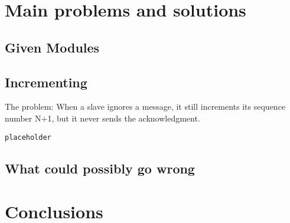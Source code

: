 \documentclass[a4paper, 11pt]{article}
\begin{document}
\section{Main problems and solutions}

\subsection{Given Modules}


\subsection{Incrementing}
The problem: When a slave ignores a message, it still increments its sequence number N+1, but it never sends the acknowledgment.

\begin{verbatim}
placeholder
\end{verbatim}

\subsection{What could possibly go wrong}





\section{Conclusions}

\end{document}
